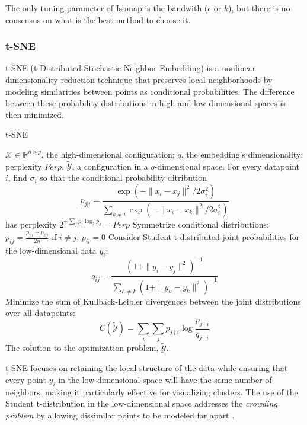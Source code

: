 The only tuning parameter of Isomap is the bandwith ($\epsilon$ or $k$), but there is no consensus on what is the best method to choose it.

\subsubsection{t-SNE}

t-SNE (t-Distributed Stochastic Neighbor Embedding) \cite{tsne} is a nonlinear dimensionality reduction technique that preserves local neighborhoods by modeling similarities between points as conditional probabilities. The difference between these probability distributions in high and low-dimensional spaces is then minimized.

\begin{algorithm}
    \caption{t-SNE}
    \label{alg:tSNE}
    
    \begin{algorithmic}[1]
    \REQUIRE $\mathcal{X} \in \mathbb{R}^{n \times p}$, the high-dimensional configuration; $q$, the embedding's dimensionality; perplexity $Perp$.
    \ENSURE $\tilde{\mathcal{Y}}$, a configuration in a $q$-dimensional space.
    \STATE For every datapoint $i$, find $\sigma_i$ so that the conditional probability ditribution
        $$p_{j|i} = \frac{\exp(-\|x_i-x_j\|^2/2\sigma_i^2)}{\sum_{k \neq i}\exp(-\|x_i-x_k\|^2/2\sigma_i^2)}$$ has perplexity $2^{-\sum_{j}p_j \log_2 p_j} = Perp$
    \STATE Symmetrize conditional distributions: $p_{ij} = \frac{p_{j|i} + p_{i|j}}{2n}$ if $i\neq j$, $p_{ii} = 0$
    \STATE Consider Student t-distributed joint probabilities for the low-dimensional data $y_i$: $$q_{ij} = \frac{(1 + \|y_i-y_j\|^2)^{-1}}{\sum_{h \neq k}(1 + \|y_h-y_k\|^2)^{-1}}$$
    \STATE Minimize the sum of Kullback-Leibler divergences between the joint distributions over all datapoints: $$C(\tilde{\mathcal{Y}})=\sum_i \sum_j p_{j \mid i} \log \frac{p_{j \mid i}}{q_{j \mid i}}$$
    \RETURN The solution to the optimization problem, $\tilde{\mathcal{Y}}$.
    
    \end{algorithmic}
\end{algorithm}

t-SNE focuses on retaining the local structure of the data while ensuring that every point $y_i$ in the low-dimensional space will have the same number of neighbors, making it particularly effective for visualizing clusters. The use of the Student t-distribution in the low-dimensional space addresses the \textit{crowding problem} by allowing dissimilar points to be modeled far apart \cite{tsne}.

